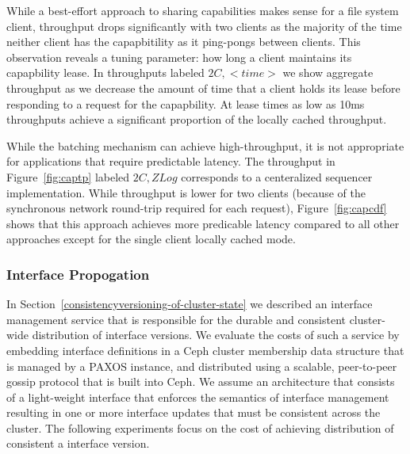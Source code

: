 \documentclass[10pt,twocolumn]{article}
\begin{document}
While a best-effort approach to sharing capabilities makes sense for a file
system client, throughput drops significantly with two clients as the majority
of the time neither client has the capapbitility as it ping-pongs between
clients. This observation reveals a tuning parameter: how long a client
maintains its capapbility lease. In throughputs labeled $2C,<time>$ we show
aggregate throughput as we decrease the amount of time that a client holds its
lease before responding to a request for the capapbility.  At lease times as
low as 10ms throughputs achieve a significant proportion of the locally cached
throughput.

While the batching mechanism can achieve high-throughput, it is not appropriate
for applications that require predictable latency. The throughput in
Figure~\ref{fig:captp} labeled $2C,ZLog$ corresponds to a centeralized
sequencer implementation. While throughput is lower for two clients (because of
the synchronous network round-trip required for each request),
Figure~\ref{fig:capcdf} shows that this approach achieves more predicable
latency compared to all other approaches except for the single client locally
cached mode.

\subsubsection{Interface Propogation}

In Section~\ref{consistencyversioning-of-cluster-state} we described an
interface management service that is responsible for the durable and
consistent cluster-wide distribution of interface versions. We evaluate the
costs of such a service by embedding interface definitions in a Ceph cluster
membership data structure that is managed by a PAXOS instance, and distributed
using a scalable, peer-to-peer gossip protocol that is built into Ceph. We
assume an architecture that consists of a light-weight interface that enforces
the semantics of interface management resulting in one or more interface
updates that must be consistent across the cluster. The following experiments
focus on the cost of achieving distribution of consistent a interface version.
\end{document}
